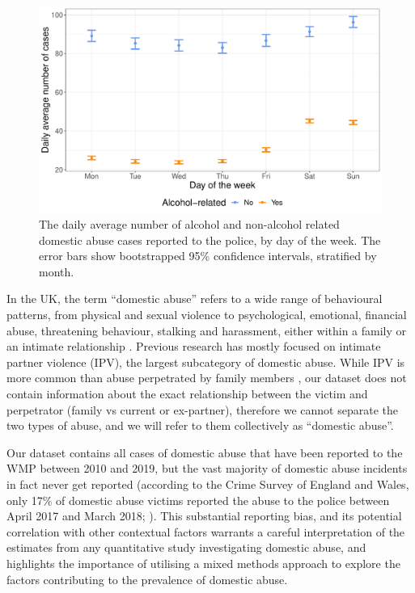 \documentclass[12pt, a4paper]{article}
\begin{document}
\begin{figure} 
\begin{center} 
\includegraphics[scale = 0.6]{descriptives.pdf}
\caption{The daily average number of alcohol and non-alcohol related domestic abuse cases reported to the police, by day of the week. The error bars show bootstrapped 95\% confidence intervals, stratified by month. \label{fig:descriptive}} 
\end{center} 
\end{figure} 

In the UK, the term ``domestic abuse'' refers to a wide range of behavioural patterns, from physical and sexual violence to psychological, emotional, financial abuse, threatening behaviour, stalking and harassment, either within a family or an intimate relationship \cite{ONS}. Previous research has mostly focused on intimate partner violence (IPV), the largest subcategory of domestic abuse. While IPV is more common than abuse perpetrated by family members \cite{ONS}, our dataset does not contain information about the exact relationship between the victim and perpetrator (family vs current or ex-partner), therefore we cannot separate the two types of abuse, and we will refer to them collectively as ``domestic abuse''.


Our dataset contains all cases of domestic abuse that have been reported to the WMP between 2010 and 2019, but the vast majority of domestic abuse incidents in fact never get reported (according to the Crime Survey of England and Wales, only 17\% of domestic abuse victims reported the abuse to the police between April 2017 and March 2018; ). This substantial reporting bias, and its potential correlation with other contextual factors warrants a careful interpretation of the estimates from any quantitative study investigating domestic abuse, and highlights the importance of utilising a mixed methods approach to explore the factors contributing to the prevalence of domestic abuse. 
  
\end{document}
